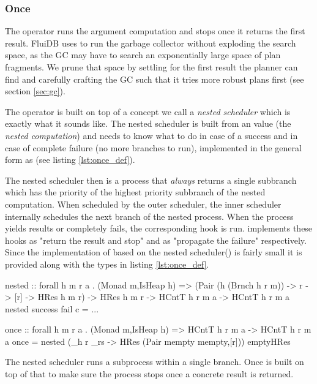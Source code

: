 \subsubsection{Once}

The  operator runs the argument computation and stops once
it returns the first result. FluiDB uses  to run the
garbage collector without exploding the search space, as the GC may
have to search an exponentially large space of plan fragments. We
prune that space by settling for the first result the planner can find
and carefully crafting the GC such that it tries more robust plans
first (see section \ref{sec:gc}).

The  operator is built on top of a concept we call a
\emph{nested scheduler} which is exactly what it sounds like.  The
nested scheduler is built from an  value (the \emph{nested
  computation}) and needs to know what to do in case of a success and
in case of complete failure (no more branches to run), implemented in
the general form as  (see listing \ref{lst:once_def}).

The nested scheduler then is a process that \emph{always} returns a
single subbranch which has the priority of the highest priority
subbranch of the nested computation. When scheduled by the outer
scheduler, the inner scheduler internally schedules the next branch of
the nested process. When the process yields results or completely
fails, the corresponding hook is run.  implements these
hooks as "return the result and stop" and as "propagate the failure"
respectively. Since the implementation of  based on the
nested scheduler() is fairly small
it is provided along with the types in listing \ref{lst:once_def}.

\begin{code}
\begin{haskellcode}
nested
  :: forall h m r a .
  (Monad m,IsHeap h)
  => (Pair (h (Brnch h r m)) -> r -> [r] -> HRes h m r)
  -> HRes h m r
  -> HCntT h r m a
  -> HCntT h r m a
nested success fail c = ...

once :: forall h m r a . (Monad m,IsHeap h) => HCntT h r m a -> HCntT h r m a
once = nested (\_h r _rs -> HRes (Pair mempty mempty,[r])) emptyHRes
\end{haskellcode}

\caption{\label{lst:once_def}The nested scheduler runs a subprocess within a single branch. Once is built on top of that to make sure the process stops once a concrete result is returned.}
\end{code}

